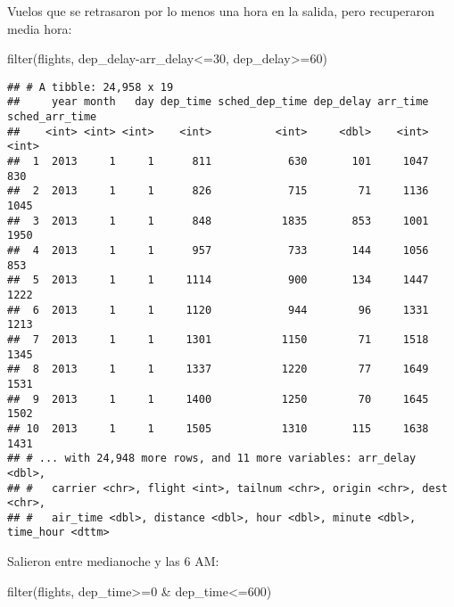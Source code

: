 \documentclass[
]{article}
\newenvironment{Shaded}{\begin{snugshade}}{\end{snugshade}}
\newcommand{\DecValTok}[1]{\textcolor[rgb]{0.00,0.00,0.81}{#1}}
\newcommand{\FunctionTok}[1]{\textcolor[rgb]{0.00,0.00,0.00}{#1}}
\newcommand{\NormalTok}[1]{#1}
\newcommand{\SpecialCharTok}[1]{\textcolor[rgb]{0.00,0.00,0.00}{#1}}
\begin{document}
Vuelos que se retrasaron por lo menos una hora en la salida, pero
recuperaron media hora:

\begin{Shaded}
\begin{Highlighting}[]
\FunctionTok{filter}\NormalTok{(flights, dep\_delay}\SpecialCharTok{{-}}\NormalTok{arr\_delay}\SpecialCharTok{\textless{}=}\DecValTok{30}\NormalTok{, dep\_delay}\SpecialCharTok{\textgreater{}=}\DecValTok{60}\NormalTok{)}
\end{Highlighting}
\end{Shaded}

\begin{verbatim}
## # A tibble: 24,958 x 19
##     year month   day dep_time sched_dep_time dep_delay arr_time sched_arr_time
##    <int> <int> <int>    <int>          <int>     <dbl>    <int>          <int>
##  1  2013     1     1      811            630       101     1047            830
##  2  2013     1     1      826            715        71     1136           1045
##  3  2013     1     1      848           1835       853     1001           1950
##  4  2013     1     1      957            733       144     1056            853
##  5  2013     1     1     1114            900       134     1447           1222
##  6  2013     1     1     1120            944        96     1331           1213
##  7  2013     1     1     1301           1150        71     1518           1345
##  8  2013     1     1     1337           1220        77     1649           1531
##  9  2013     1     1     1400           1250        70     1645           1502
## 10  2013     1     1     1505           1310       115     1638           1431
## # ... with 24,948 more rows, and 11 more variables: arr_delay <dbl>,
## #   carrier <chr>, flight <int>, tailnum <chr>, origin <chr>, dest <chr>,
## #   air_time <dbl>, distance <dbl>, hour <dbl>, minute <dbl>, time_hour <dttm>
\end{verbatim}

Salieron entre medianoche y las 6 AM:

\begin{Shaded}
\begin{Highlighting}[]
\FunctionTok{filter}\NormalTok{(flights, dep\_time}\SpecialCharTok{\textgreater{}=}\DecValTok{0} \SpecialCharTok{\&}\NormalTok{ dep\_time}\SpecialCharTok{\textless{}=}\DecValTok{600}\NormalTok{)}
\end{Highlighting}
\end{Shaded}
\end{document}
